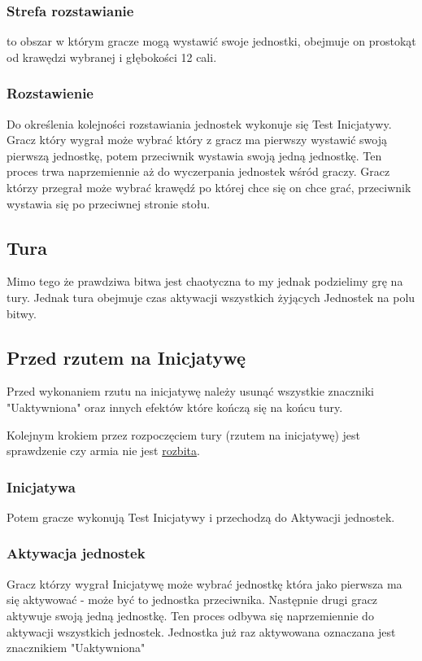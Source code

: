 \subsubsection{Strefa rozstawianie} to obszar w którym gracze mogą wystawić swoje jednostki, obejmuje on prostokąt od krawędzi wybranej i głębokości 12 cali. 

\subsubsection{Rozstawienie}
Do określenia kolejności rozstawiania jednostek wykonuje się Test Inicjatywy. Gracz który wygrał może wybrać który z gracz ma pierwszy wystawić swoją pierwszą jednostkę, potem przeciwnik wystawia swoją jedną jednostkę. Ten proces trwa naprzemiennie aż do wyczerpania jednostek wśród graczy. Gracz którzy przegrał może wybrać krawędź po której chce się on chce grać, przeciwnik wystawia się po przeciwnej stronie stołu. 

\subsection{Tura}

Mimo tego że prawdziwa bitwa jest chaotyczna to my jednak podzielimy grę na tury. Jednak tura obejmuje czas aktywacji wszystkich żyjących Jednostek na polu bitwy. 

\subsection{Przed rzutem na Inicjatywę}
Przed wykonaniem rzutu na inicjatywę należy usunąć wszystkie znaczniki "Uaktywniona" oraz innych efektów które kończą się na końcu tury. 

Kolejnym krokiem przez rozpoczęciem tury (rzutem na inicjatywę) jest sprawdzenie czy armia nie jest \hyperref[sec:link_rozbicie]{rozbita}.

\subsubsection{Inicjatywa}

Potem gracze wykonują Test Inicjatywy i przechodzą do Aktywacji jednostek. 

\subsubsection{Aktywacja jednostek}
Gracz którzy wygrał Inicjatywę może wybrać jednostkę która jako pierwsza ma się aktywować - może być to jednostka przeciwnika. Następnie drugi gracz aktywuje swoją jedną jednostkę. Ten proces odbywa się naprzemiennie do aktywacji wszystkich jednostek. Jednostka już raz aktywowana oznaczana jest znacznikiem "Uaktywniona"

